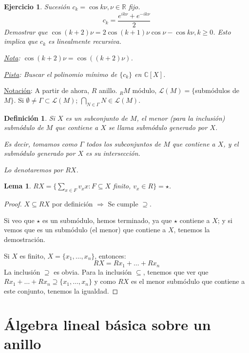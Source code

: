 \documentclass[11pt,a4paper]{article}
\theoremstyle{break}
\newtheorem{lemma}[theorem]{Lema}
\newtheorem{definition}[theorem]{Definición}
\newtheorem{task}[theorem]{Ejercicio}
\begin{document}
\begin{task}
Sucesión $c_{k} = \cos k \nu, \nu \in \mathbb{R}$ fijo.
$$c_{k} = \frac{e^{ik\nu} + e^{-ik\nu}}{2}$$
Demostrar que $\cos(k+2)\nu = 2 \cos(k + 1) \nu \cos \nu - \cos k \nu, k \geq 0$. Esto implica que $c_{k}$ es linealmente recursiva.

\underline{Nota}: $\cos (k + 2) \nu = \cos ((k+2) \nu)$.

\underline{Pista}: Buscar el polinomio mínimo de $\{c_{k}\}$ en $\mathbb{C}[X]$.
\end{task}


\underline{Notación}: A partir de ahora, $R$ anillo. $_{R}M$ módulo, $\mathcal{L}(M) = \{$submódulos de $M\}$. Si $\emptyset \neq \Gamma \subset \mathcal{L}(M)$; $\bigcap\limits_{N \in \Gamma}N \in \mathcal{L}(M)$.

\begin{definition}
Si $X$ es un subconjunto de $M$, el menor (para la inclusión) submódulo de $M$ que contiene a $X$ se llama submódulo generado por $X$.

Es decir, tomamos como $\Gamma$ todos los subconjuntos de $M$ que contiene a $X$, y el submódulo generado por $X$  es su intersección.

Lo denotaremos por $RX$.
\end{definition}

\begin{lemma}
$RX = \{\sum\limits_{x \in F} v_{x} x: F \subseteq X$ finito, $v_{x} \in R\} = \star$.
\end{lemma}

\begin{proof}
$X \subseteq RX$ por definición $\Rightarrow$ Se cumple $\supseteq$.

Si veo que $\star$ es un submódulo, hemos terminado, ya que $\star$ contiene a $X$; y si vemos que es un submódulo (el menor) que contiene a $X$, tenemos la demostración.

Si $X$ es finito, $X = \{x_{1},  \dots, x_{n}\}$, entonces:
$$RX = Rx_{1} + \dots + Rx_{n}$$
La inclusión $\supseteq$ es obvia. Para la inclusión $\subseteq$, tenemos que ver que $Rx_{1} + \dots + Rx_{n} \supseteq \{x_{1}, \dots, x_{n}\}$ y como $RX$ es el menor submódulo que contiene a este conjunto, tenemos la igualdad.
\end{proof}

\newpage

\section{Álgebra lineal básica sobre un anillo}
\end{document}
